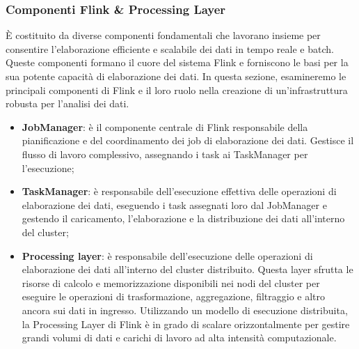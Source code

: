 \subsubsection{Componenti Flink \& Processing Layer}
È costituito da diverse componenti fondamentali che lavorano insieme per consentire l'elaborazione efficiente e scalabile dei dati in tempo reale e batch. Queste componenti formano il cuore del sistema Flink e forniscono le basi per la sua potente capacità di elaborazione dei dati. In questa sezione, esamineremo le principali componenti di Flink e il loro ruolo nella creazione di un'infrastruttura robusta per l'analisi dei dati.
\begin{itemize}
	\item \textbf{JobManager}: è il componente centrale di Flink responsabile della pianificazione e del coordinamento dei job di elaborazione dei dati. Gestisce il flusso di lavoro complessivo, assegnando i task ai TaskManager per l'esecuzione;
	\item \textbf{TaskManager}: è responsabile dell'esecuzione effettiva delle operazioni di elaborazione dei dati, eseguendo i task assegnati loro dal JobManager e gestendo il caricamento, l'elaborazione e la distribuzione dei dati all'interno del cluster;
	\item \textbf{Processing layer}: è responsabile dell'esecuzione delle operazioni di elaborazione dei dati all'interno del cluster distribuito. Questa layer sfrutta le risorse di calcolo e memorizzazione disponibili nei nodi del cluster per eseguire le operazioni di trasformazione, aggregazione, filtraggio e altro ancora sui dati in ingresso. Utilizzando un modello di esecuzione distribuita, la Processing Layer di Flink è in grado di scalare orizzontalmente per gestire grandi volumi di dati e carichi di lavoro ad alta intensità computazionale.
\end{itemize}
